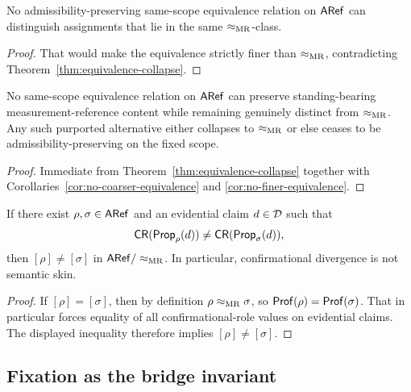 \begin{corollary}
\label{cor:no-finer-equivalence}
No admissibility-preserving same-scope equivalence relation on $\mathsf{ARef}$ can distinguish assignments
that lie in the same $\mathrel{\approx_{\mathrm{MR}}}$-class.
\end{corollary}

\begin{proof}
That would make the equivalence strictly finer than $\mathrel{\approx_{\mathrm{MR}}}$, contradicting
Theorem~\ref{thm:equivalence-collapse}.
\end{proof}

\begin{corollary}
\label{cor:alternative-equivalence-collapse}
No same-scope equivalence relation on $\mathsf{ARef}$ can preserve standing-bearing measurement-reference
content while remaining genuinely distinct from $\mathrel{\approx_{\mathrm{MR}}}$. Any such purported alternative either
collapses to $\mathrel{\approx_{\mathrm{MR}}}$ or else ceases to be admissibility-preserving on the fixed scope.
\end{corollary}

\begin{proof}
Immediate from Theorem~\ref{thm:equivalence-collapse} together with
Corollaries~\ref{cor:no-coarser-equivalence} and \ref{cor:no-finer-equivalence}.
\end{proof}

\begin{corollary}
\label{cor:confirmational-divergence-quotient-relevant}
If there exist $\rho,\sigma\in\mathsf{ARef}$ and an evidential claim $d\in\mathcal{D}$ such that
\[
\mathsf{CR}(\mathsf{Prop}_\rho(d))\neq \mathsf{CR}(\mathsf{Prop}_\sigma(d)),
\]
then $[\rho]\neq[\sigma]$ in $\mathsf{ARef}/\mathrel{\approx_{\mathrm{MR}}}$. In particular, confirmational divergence is not semantic
skin.
\end{corollary}

\begin{proof}
If $[\rho]=[\sigma]$, then by definition $\rho\mathrel{\approx_{\mathrm{MR}}}\sigma$, so $\mathsf{Prof}(\rho)=\mathsf{Prof}(\sigma)$. That in
particular forces equality of all confirmational-role values on evidential claims. The displayed
inequality therefore implies $[\rho]\neq[\sigma]$.
\end{proof}

\subsection{Fixation as the bridge invariant}

